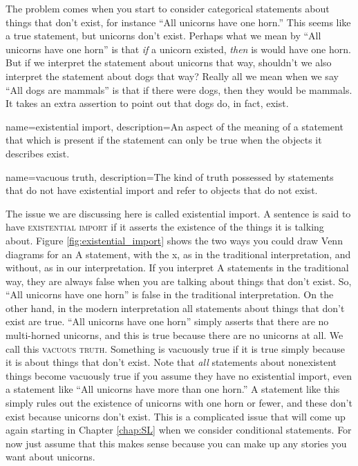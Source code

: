 The problem comes when you start to consider categorical statements about things that don't exist, for instance ``All unicorns have one horn.'' This seems like a true statement, but unicorns don't exist. Perhaps what we mean by ``All unicorns have one horn'' is that \emph{if} a unicorn existed, \emph{then} is would have one horn. But if we interpret the statement about unicorns that way, shouldn't we also interpret the statement about dogs that way? Really all we mean when we say ``All dogs are mammals'' is that if there were dogs, then they would be mammals. It takes an extra assertion to point out that dogs do, in fact, exist.

{
name=existential import,
description={An aspect of the meaning of a statement that which is present if the statement can only be true when the objects it describes exist.}
}

{
name=vacuous truth,
description={The kind of truth possessed by statements that do not have existential import and refer to objects that do not exist.}
}

The issue we are discussing here is called existential import. A sentence is said to have \textsc{\gls{existential import}} \label{def:Existential_import} if it asserts the existence of the things it is talking about. Figure \ref{fig:existential_import} shows the two ways you could draw Venn diagrams for an A statement, with the x, as in the traditional interpretation, and without, as in our interpretation. If you interpret A statements in the traditional way, they are always false when you are talking about things that don't exist. So, ``All unicorns have one horn'' is false in the traditional interpretation. On the other hand, in the modern interpretation all statements about things that don't exist are true. ``All unicorns have one horn'' simply asserts that there are no multi-horned unicorns, and this is true because there are no unicorns at all. We call this \textsc{\gls{vacuous truth}}. Something is vacuously true \label{def:Vacuous_truth} if it is true simply because it is about things that don't exist. Note that \emph{all} statements about nonexistent things become vacuously true if you assume they have no existential import, even a statement like ``All unicorns have more than one horn.'' A statement like this simply rules out the existence of unicorns with one horn or fewer, and these don't exist because unicorns don't exist. This is a complicated issue that will come up again starting in Chapter \ref{chap:SL} when we consider conditional statements. For now just assume that this makes sense because you can make up any stories you want about unicorns.

